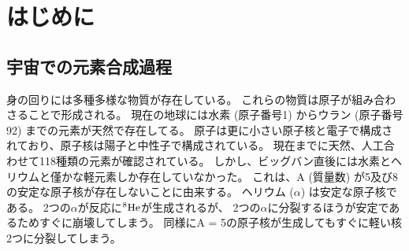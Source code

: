 \chapter{はじめに}
\section{宇宙での元素合成過程}
\label{seq::nucleaosynthesis}
身の回りには多種多様な物質が存在している。
これらの物質は原子が組み合わさることで形成される。
現在の地球には水素 (原子番号1) からウラン (原子番号92) までの元素が天然で存在してる。
原子は更に小さい原子核と電子で構成されており、原子核は陽子と中性子で構成されている。
現在までに天然、人工合わせて118種類の元素が確認されている。
しかし、ビッグバン直後には水素とヘリウムと僅かな軽元素しか存在していなかった。
これは、A (質量数) が5及び8の安定な原子核が存在しないことに由来する。
ヘリウム ($\alpha$) は安定な原子核である。
2つの$\alpha$が反応に${}^{8}{\rm He}$が生成されるが、
2つの$\alpha$に分裂するほうが安定であるためすぐに崩壊してしまう。
同様にA = 5の原子核が生成してもすぐに軽い核2つに分裂してしまう。

